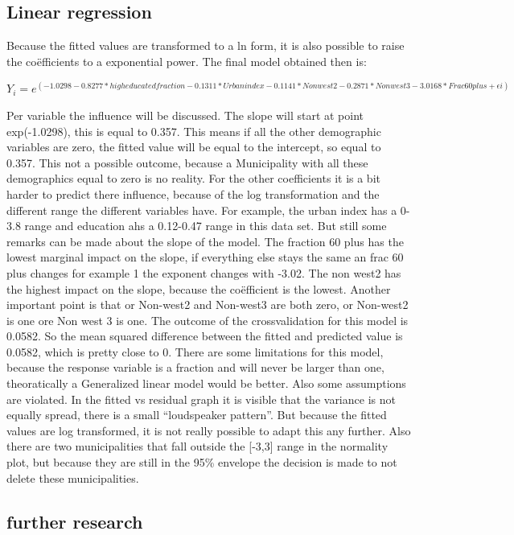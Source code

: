 \documentclass[11pt,]{article}
\begin{document}
\subsection{Linear regression}\label{linear-regression}

Because the fitted values are transformed to a ln form, it is also
possible to raise the coëfficients to a exponential power. The final
model obtained then is:

\(Y_i = e^(-1.0298 -0.8277*high educated fraction -0.1311*Urban index -0.1141*Non west2 -0.2871*Non west3 -3.0168*Frac 60plus + \epsilon i)\)

Per variable the influence will be discussed. The slope will start at
point exp(-1.0298), this is equal to 0.357. This means if all the other
demographic variables are zero, the fitted value will be equal to the
intercept, so equal to 0.357. This not a possible outcome, because a
Municipality with all these demographics equal to zero is no reality.
For the other coefficients it is a bit harder to predict there
influence, because of the log transformation and the different range the
different variables have. For example, the urban index has a 0-3.8 range
and education ahs a 0.12-0.47 range in this data set. But still some
remarks can be made about the slope of the model. The fraction 60 plus
has the lowest marginal impact on the slope, if everything else stays
the same an frac 60 plus changes for example 1 the exponent changes with
-3.02. The non west2 has the highest impact on the slope, because the
coëfficient is the lowest. Another important point is that or Non-west2
and Non-west3 are both zero, or Non-west2 is one ore Non west 3 is one.
The outcome of the crossvalidation for this model is 0.0582. So the mean
squared difference between the fitted and predicted value is 0.0582,
which is pretty close to 0. There are some limitations for this model,
because the response variable is a fraction and will never be larger
than one, theoratically a Generalized linear model would be better. Also
some assumptions are violated. In the fitted vs residual graph it is
visible that the variance is not equally spread, there is a small
``loudspeaker pattern''. But because the fitted values are log
transformed, it is not really possible to adapt this any further. Also
there are two municipalities that fall outside the {[}-3,3{]} range in
the normality plot, but because they are still in the 95\% envelope the
decision is made to not delete these municipalities.

\subsection{further research}\label{further-research}
\end{document}
